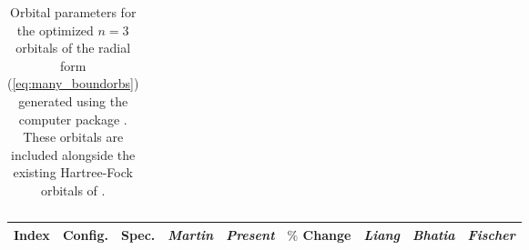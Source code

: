 \begin{table}[hbt]
\begin{center}
\begin{tabular}{@{}        l r c r     |      l r c r        @{}}
\bottomrule
 \end{tabular}
  \caption{Orbital parameters for the optimized $n = 3$ orbitals of the radial form (\ref{eq:many_boundorbs}) generated using the computer package . These orbitals are included alongside the existing Hartree-Fock orbitals of \citet{1974ADNDT..14..177C}. \label{tab:sul_orbitals}}
 \end{center}
\end{table}


\begin{table}[hbt]
\footnotesize
\begin{center}
\begin{tabular}{@{} l *4c c *3c @{}}
\toprule

\multicolumn{1}{c}{Index} & \multicolumn{1}{c}{Config.} & \multicolumn{1}{c}{Spec.} & \multicolumn{1}{c}{\textit{Martin}} & \multicolumn{1}{c}{\textit{Present}} &  \multicolumn{1}{c}{$\%$ Change} & \multicolumn{1}{c}{\textit{Liang}} & \multicolumn{1}{c}{\textit{Bhatia}} &  \multicolumn{1}{c}{\textit{Fischer}}    \\

\toprule


\end{tabular}
\end{center}
\end{table}
